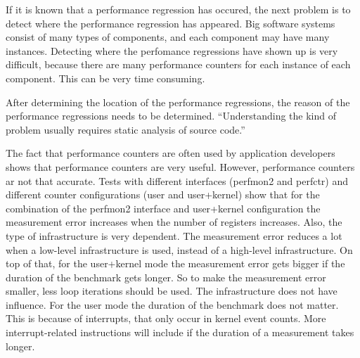 If it is known that a performance regression has occured, the next problem is to detect where the performance regression has appeared. Big software systems consist of many types of components, and each component may have many instances. Detecting where the perfomance regressions have shown up is very difficult, because there are many performance counters for each instance of each component. This can be very time consuming.

After determining the location of the performance regressions, the reason of the performance regressions needs to be determined. ``Understanding the kind of problem usually requires static analysis of source code.'' \cite{nguyen2012using}

The fact that performance counters are often used by application developers shows that performance counters are very useful. However, performance counters ar not that accurate. Tests with different interfaces (perfmon2 and perfctr) and different counter configurations (user and user+kernel) show that for the combination of the perfmon2 interface and user+kernel configuration the measurement error increases when the number of registers increases. \cite{AccuracyPerformanceCounter}
Also, the type of infrastructure is very dependent. The measurement error reduces a lot when a low-level infrastructure is used, instead of a high-level infrastructure.
On top of that, for the user+kernel mode the measurement error gets bigger if the duration of the benchmark gets longer. \cite{AccuracyPerformanceCounter} So to make the measurement error smaller, less loop iterations should be used.  The infrastructure does not have influence. For the user mode the duration of the benchmark does not matter. This is because of interrupts, that only occur in kernel event counts. More interrupt-related instructions will include if the duration of a measurement takes longer.
